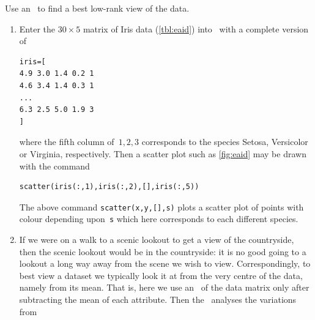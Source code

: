 \begin{example}
\begin{solution} 
Use an \svd\ to find a best low-rank view of the data.
\begin{enumerate}
\item Enter the \(30\times5\) matrix of Iris data (\cref{tbl:eaid}) into \script\  with a complete version of
\begin{verbatim}
iris=[
4.9 3.0 1.4 0.2 1
4.6 3.4 1.4 0.3 1
...
6.3 2.5 5.0 1.9 3
]
\end{verbatim}
where the fifth column of~\(1,2,3\) corresponds to the species Setosa, Versicolor or Virginia, respectively.
\setbox\ajrqrbox\hbox{}%
\marginajrbox%
Then a scatter plot such as \cref{fig:eaid} may be drawn with the command
\begin{verbatim}
scatter(iris(:,1),iris(:,2),[],iris(:,5))
\end{verbatim}
The above command \verb|scatter(x,y,[],s)|  plots a scatter plot of points with colour depending upon~\verb|s| which here corresponds to each different species.

\item If we were on a walk to a scenic lookout to get a view of the countryside, then the scenic lookout would be in the countryside: it is no good going to a lookout a long way away from the scene we wish to view.
Correspondingly, to best view a dataset we typically look it at from the very centre of the data, namely from its mean.
That is, here we use an \svd\ of the data matrix only after subtracting the mean of each attribute.
Then the \svd\ analyses the variations from 


\end{enumerate}
\end{solution}
\end{example}
